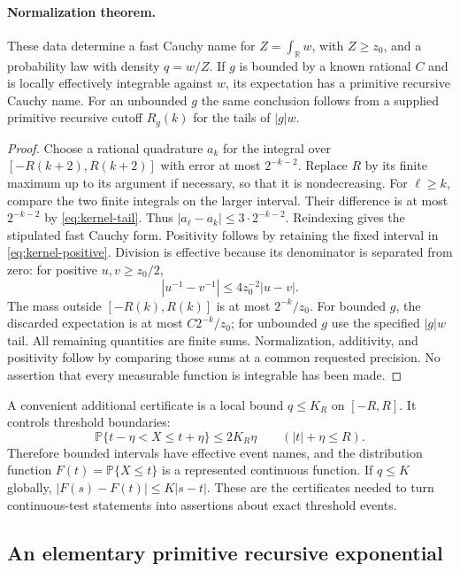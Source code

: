 \paragraph{Normalization theorem.}
These data determine a fast Cauchy name for
$Z=\int_{\mathbb R}w$, with $Z\geq z_0$, and a probability law with density
$q=w/Z$.  If $g$ is bounded by a known rational $C$ and is locally effectively
integrable against $w$, its expectation has a primitive recursive Cauchy name.
For an unbounded $g$ the same conclusion follows from a supplied primitive
recursive cutoff $R_g(k)$ for the tails of $|g|w$.

\begin{proof}
Choose a rational quadrature $a_k$ for the integral over
$[-R(k+2),R(k+2)]$ with error at most $2^{-k-2}$.  Replace $R$ by its finite
maximum up to its argument if necessary, so that it is nondecreasing.
For $\ell\geq k$, compare the two finite integrals on the larger interval.
Their difference is at most $2^{-k-2}$ by \eqref{eq:kernel-tail}.  Thus
$|a_\ell-a_k|\leq 3\cdot2^{-k-2}$.  Reindexing gives the stipulated fast
Cauchy form.  Positivity follows by retaining the fixed interval in
\eqref{eq:kernel-positive}.  Division is effective because its denominator
is separated from zero: for positive $u,v\geq z_0/2$,
\[
 |u^{-1}-v^{-1}|\leq 4z_0^{-2}|u-v|.
\]
The mass outside $[-R(k),R(k)]$ is at most $2^{-k}/z_0$.
For bounded $g$, the discarded expectation is at most $C2^{-k}/z_0$;
for unbounded $g$ use the specified $|g|w$ tail.  All remaining quantities
are finite sums.  Normalization, additivity, and positivity follow by
comparing those sums at a common requested precision.  No assertion that
every measurable function is integrable has been made.
\end{proof}

A convenient additional certificate is a local bound $q\leq K_R$ on
$[-R,R]$.  It controls threshold boundaries:
\[
 \mathbb P\{t-\eta<X\leq t+\eta\}\leq 2K_R\eta
 \qquad (|t|+\eta\leq R).
\]
Therefore bounded intervals have effective event names, and the distribution
function $F(t)=\mathbb P\{X\leq t\}$ is a represented continuous function.
If $q\leq K$ globally, $|F(s)-F(t)|\leq K|s-t|$.  These are the certificates
needed to turn continuous-test statements into assertions about exact
threshold events.

\subsection{An elementary primitive recursive exponential}

